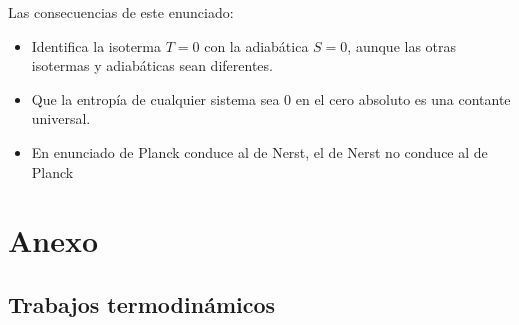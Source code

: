 \documentclass[12pt,a4paper]{article}
\begin{document}
Las consecuencias de este enunciado: 

\begin{itemize}
\item Identifica la isoterma $T=0$ con la adiabática $S=0$, aunque las otras isotermas y adiabáticas sean diferentes.

\item Que la entropía de cualquier sistema sea 0 en el cero absoluto es una contante universal.

\item En enunciado de Planck conduce al de Nerst, el de Nerst no conduce al de Planck
\end{itemize}
\newpage
\appendix 

\section{Anexo}
\subsection{Trabajos termodinámicos}
\end{document}
